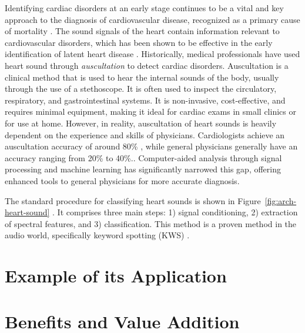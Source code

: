 \documentclass[12pt]{article}
\begin{document}
Identifying cardiac disorders at an early stage continues to be a vital and key approach to the diagnosis of cardiovascular disease, recognized as a primary cause of mortality \cite{members2016heart}.  
The sound signals of the heart contain information relevant to cardiovascular disorders, which has been shown to be effective in the early identification of latent heart disease \cite{yuenyong2011framework}. Historically, medical professionals have used heart sound through \textit{auscultation} to detect cardiac disorders.
Auscultation is a clinical method that is used to hear the internal sounds of the body, usually through the use of a stethoscope. It is often used to inspect the circulatory, respiratory, and gastrointestinal systems.
It is non-invasive, cost-effective, and requires minimal equipment, making it ideal for cardiac exams in small clinics or for use at home.
However, in reality, auscultation of heart sounds is heavily dependent on the experience and skills of physicians.
Cardiologists achieve an auscultation accuracy of around 80\% \cite{strunic2007detection}, while general physicians generally have an accuracy ranging from 20\% to 40\%.\cite{lam2018factors}. Computer-aided analysis through signal processing and machine learning has significantly narrowed this gap, offering enhanced tools to general physicians for more accurate diagnosis.

The standard procedure for classifying heart sounds is shown in Figure~\ref{fig:arch-heart-sound} \cite{gupta2007neural, nguyen2023heart}. It comprises three main steps: 1) signal conditioning, 2) extraction of spectral features, and 3) classification. This method is a proven method in the audio world, specifically keyword spotting (KWS) \cite{chong20220}.
 
\section{Example of its Application}


\section{Benefits and Value Addition}
\end{document}
